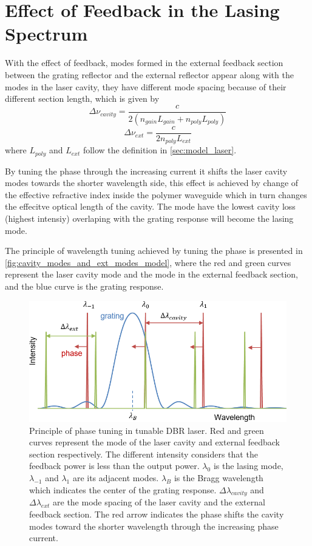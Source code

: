 \section{Effect of Feedback in the Lasing Spectrum}\label{sec:feedback_influenced_lasing_spectral_behavior}
With the effect of feedback, modes formed in the external feedback section between the grating reflector and the external reflector appear along with the modes in the laser cavity, they have different mode spacing because of their different section length, which is given by \cite{coldren2012diode}
\begin{equation}
    \Delta\nu_{cavity}=\frac{c}{2(n_{gain}L_{gain}+n_{poly}L_{poly})}
    \label{eq:mode_spacing_laser_cavity}
\end{equation}
\begin{equation}
    \Delta\nu_{ext}=\frac{c}{2n_{poly}L_{ext}}
    \label{eq:mode_spacing_external}
\end{equation}
where $L_{poly}$ and $L_{ext}$ follow the definition in \autoref{sec:model_laser}.

By tuning the phase through the increasing current it shifts the laser cavity modes towards the shorter wavelength side, this effect is achieved by change of the effective refractive index inside the polymer waveguide which in turn changes the effecitve optical length of the cavity. The mode have the lowest cavity loss (highest intensiy) overlaping with the grating response will become the lasing mode.

The principle of wavelength tuning achieved by tuning the phase is presented in \autoref{fig:cavity_modes_and_ext_modes_model}, where the red and green curves represent the laser cavity mode and the mode in the external feedback section, and the blue curve is the grating response. 

\begin{figure}[ht]
    \centering
    \includegraphics[width=.7\linewidth]{figures/cavity_modes_and_ext_modes_model.png}
    \caption{Principle of phase tuning in tunable DBR laser. Red and green curves represent the mode of the laser cavity and external feedback section respectively. The different intensity considers that the feedback power is less than the output power. $\lambda_0$ is the lasing mode, $\lambda_{-1}$ and $\lambda_{1}$ are its adjacent modes. $\lambda_B$ is the Bragg wavelength which indicates the center of the grating response. $\Delta\lambda_{cavity}$ and $\Delta\lambda_{ext}$ are the mode spacing of the laser cavity and the external feedback section. The red arrow indicates the phase shifts the cavity modes toward the shorter wavelength through the increasing phase current. }
    \label{fig:cavity_modes_and_ext_modes_model}
\end{figure}

